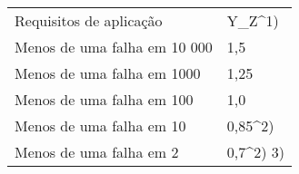 \begin{table}[]
\begin{tabular}{ll}
Requisitos de aplicação      & Y_Z^1)    \\
Menos de uma falha em 10 000 & 1,5       \\
Menos de uma falha em 1000   & 1,25      \\
Menos de uma falha em 100    & 1,0       \\
Menos de uma falha em 10     & 0,85^2)   \\
Menos de uma falha em 2      & 0,7^2) 3)
\end{tabular}
\end{table}